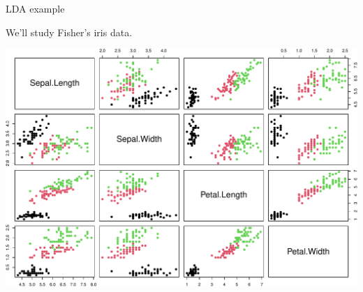 \documentclass[
  ignorenonframetext,
]{beamer}
\newenvironment{Shaded}{\begin{snugshade}}{\end{snugshade}}
\newcommand{\DataTypeTok}[1]{\textcolor[rgb]{0.13,0.29,0.53}{#1}}
\newcommand{\DecValTok}[1]{\textcolor[rgb]{0.00,0.00,0.81}{#1}}
\newcommand{\KeywordTok}[1]{\textcolor[rgb]{0.13,0.29,0.53}{\textbf{#1}}}
\newcommand{\NormalTok}[1]{#1}
\newcommand{\OperatorTok}[1]{\textcolor[rgb]{0.81,0.36,0.00}{\textbf{#1}}}
\begin{document}
\begin{frame}[fragile]{LDA example}
\protect\hypertarget{lda-example}{}

We'll study Fisher's iris data.

\scriptsize

\begin{Shaded}
\end{Shaded}

\includegraphics{classify_files/figure-beamer/unnamed-chunk-3-1.pdf}

\end{frame}
\end{document}
